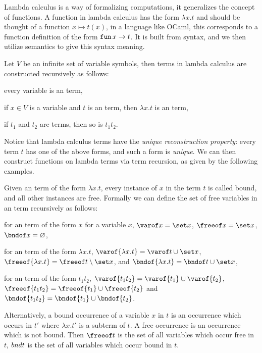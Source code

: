 Lambda calculus is a way of formalizing computations, it generalizes the concept of functions.
A function in lambda calculus has the form $\lambda x.t$ and should be thought of a function $x\mapsto t(x)$, in a language like OCaml, this corresponds to a function definition of the form
${\tt fun}\,x\to t$.
It is built from syntax, and we then utilize semantics to give this syntax meaning.

\bdefn

    Let $V$ be an infinite set of variable symbols, then terms in lambda calculus are constructed recursively as follows:
    \benum
        \item every variable is an term,
        \item if $x\in V$ is a variable and $t$ is an term, then $\lambda x.t$ is an term,
        \item if $t_1$ and $t_2$ are terms, then so is $t_1t_2$.
    \eenum

\edefn

Notice that lambda calculus terms have the {\it unique reconstruction property}: every term $t$ has one of the above forms, and such a form is {\it unique}.
We can then construct functions on lambda terms via term recursion, as given by the following examples.

\bdefn

    Given an term of the form $\lambda x.t$, every instance of $x$ in the term $t$ is called {\emphcolor bound}, and all other instances are {\emphcolor free}.
    Formally we can define the set of free variables in an term recursively as follows:
    \benum
        \item for an term of the form $x$ for a variable $x$, $\varof x=\set x$, $\freeof x=\set x$, $\bndof x=\varnothing$,
        \item for an term of the form $\lambda x.t$, $\varof{\lambda x.t}=\varof t\cup\set x$, $\freeof{\lambda x.t}=\freeof t\setminus\set x$, and $\bndof{\lambda x.t}=\bndof t\cup\set x$,
        \item for an term of the form $t_1t_2$, $\varof{t_1t_2}=\varof{t_1}\cup\varof{t_2}$, $\freeof{t_1t_2}=\freeof{t_1}\cup\freeof{t_2}$ and $\bndof{t_1t_2}=\bndof{t_1}\cup\bndof{t_2}$.
    \eenum

    Alternatively, a {\emphcolor bound occurrence} of a variable $x$ in $t$ is an occurrence which occurs in $t'$ where $\lambda x.t'$ is a subterm of $t$.
    A {\emphcolor free occurrence} is an occurrence which is not bound.
    Then $\freeof t$ is the set of all variables which occur free in $t$, ${\sl bnd} t$ is the set of all variables which occur bound in $t$.

